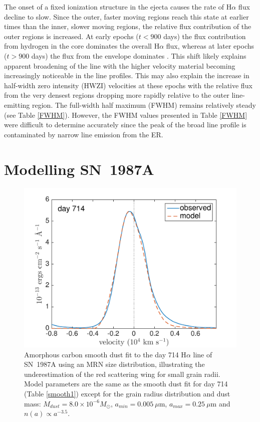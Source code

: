The onset of a fixed ionization structure in the ejecta causes the rate of 
H$\alpha$ flux decline to slow.  Since the outer, faster moving regions 
reach this state at earlier times than the inner, slower moving regions, 
the relative flux contribution of the outer regions is increased.  At 
early epochs ($t<900$ days) the flux contribution from hydrogen in the 
core dominates the overall H$\alpha$ flux, whereas at later epochs ($t > 
900$ days) the flux from the envelope dominates \citep{Fransson1993, 
Kozma1998a}.  This shift likely explains apparent broadening of the line 
with the higher velocity material becoming increasingly noticeable in the 
line profiles.  This may also explain the increase in half-width zero intensity (HWZI) velocities at 
these epochs with the relative flux from the very densest regions dropping 
more rapidly relative to the outer line-emitting region. The full-width 
half maximum (FWHM) remains relatively steady (see Table 
\ref{FWHM}). However, the FWHM values presented in Table \ref{FWHM} were difficult 
to determine accurately since the peak of the broad line profile is 
contaminated by narrow line emission from the ER.


\section{Modelling SN~1987A}
\label{results}
\begin{figure}
\centering
\includegraphics[trim =23 0 45 15,clip=true,scale=0.65]{chapters/chapter5/images/smooth/d714Ha_smooth_amC_MRN.pdf}
\caption{Amorphous carbon smooth dust fit to the day 714 H$\alpha$ 
line of SN~1987A using an MRN size distribution,
illustrating the underestimation of the red scattering wing for small 
grain radii.  Model parameters are the same as the smooth dust fit for 
day 714 (Table \ref{smooth1}) except for the 
grain radius distribution and dust mass:  $M_{dust}=8.0 \times 10^{-6} 
M_{\odot}$, $a_{min}=0.005~\mu$m, $a_{max}=0.25~\mu$m and $n(a) \propto 
a^{-3.5}$.}
\label{MRN}

\end{figure}




